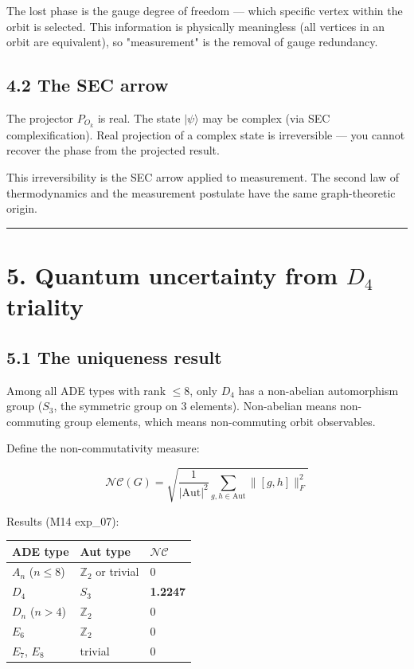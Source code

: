 \documentclass[11pt,a4paper]{article}
\begin{document}
The lost phase is the gauge degree of freedom — which specific vertex within the orbit is selected. This information is physically meaningless (all vertices in an orbit are equivalent), so "measurement" is the removal of gauge redundancy.

\subsection*{4.2 The SEC arrow}

The projector $P_{O_k}$ is real. The state $|\psi\rangle$ may be complex (via SEC complexification). Real projection of a complex state is irreversible — you cannot recover the phase from the projected result.

This irreversibility is the SEC arrow applied to measurement. The second law of thermodynamics and the measurement postulate have the same graph-theoretic origin.

\begin{center}\rule{0.5\linewidth}{0.4pt}\end{center}

\section*{5. Quantum uncertainty from $D_4$ triality}

\subsection*{5.1 The uniqueness result}

Among all ADE types with rank $\leq 8$, only $D_4$ has a non-abelian automorphism group ($S_3$, the symmetric group on 3 elements). Non-abelian means non-commuting group elements, which means non-commuting orbit observables.

Define the non-commutativity measure:

\[\mathcal{NC}(G) = \sqrt{\frac{1}{|\text{Aut}|^2} \sum_{g,h \in \text{Aut}} \|[g, h]\|_F^2}\]

Results (M14 exp\_07):

\begin{longtable}[]{@{}lll@{}}
\toprule
ADE type & Aut type & $\mathcal{NC}$ \\
\midrule\endhead
$A_n$ ($n \leq 8$) & $\mathbb{Z}_2$ or trivial & 0 \\
$D_4$ & $S_3$ & \textbf{1.2247} \\
$D_n$ ($n > 4$) & $\mathbb{Z}_2$ & 0 \\
$E_6$ & $\mathbb{Z}_2$ & 0 \\
$E_7$, $E_8$ & trivial & 0 \\
\bottomrule
\end{longtable}
\end{document}
